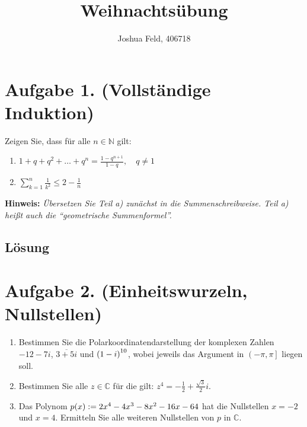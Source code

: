 \documentclass[german,12pt]{homework}
\title{Weihnachtsübung}
\author{Joshua Feld, 406718}
\institute{RWTH Aachen University\\Center for Computational Engineering Science}
\newcommand{\NN}{\mathbb{N}}
\newcommand{\CC}{\mathbb{C}}
\DeclarePairedDelimiter{\enbrace}{(}{)}
\begin{document}
    \maketitle
    \section*{Aufgabe 1. (Vollständige Induktion)}

    \begin{problem}
        Zeigen Sie, dass für alle \(n \in \NN\) gilt:
        \begin{enumerate}
            \item \(1 + q + q^2 + \ldots + q^n = \frac{1 - q^{n + 1}}{1 - q}, \quad q \ne 1\)
            \item \(\sum_{k = 1}^n\frac{1}{k^2} \le 2 - \frac{1}{n}\)
        \end{enumerate}
        \textbf{Hinweis:} \quad \emph{Übersetzen Sie Teil a) zunächst in die Summenschreibweise. Teil a) heißt auch die ``geometrische Summenformel''.}
    \end{problem}

    \subsection*{Lösung} \clearpage

    \section*{Aufgabe 2. (Einheitswurzeln, Nullstellen)}

    \begin{problem}
        \begin{enumerate}
            \item Bestimmen Sie die Polarkoordinatendarstellung der komplexen Zahlen \(-12 - 7i\), \(\overline{3 + 5i}\) und \(\enbrace*{1 - i}^{10}\), wobei jeweils das Argument in \(\left(-\pi, \pi\right]\) liegen soll.
            \item Bestimmen Sie alle \(z \in \CC\) für die gilt: \(z^4 = -\frac{1}{2} + \frac{\sqrt{3}}{2}i\).
            \item Das Polynom \(p\enbrace*{x} := 2x^4 - 4x^3 - 8x^2 - 16x - 64\)
            hat die Nullstellen \(x = -2\) und \(x = 4\). Ermitteln Sie alle weiteren Nullstellen von \(p\) in \(\CC\).
        \end{enumerate}
    \end{problem}
\end{document}
